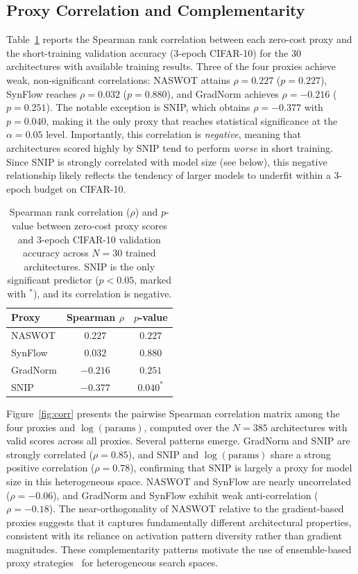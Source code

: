 \documentclass[10pt,twocolumn,letterpaper]{article}
\newcommand{\naswot}{NASWOT\xspace}
\begin{document}
\subsection{Proxy Correlation and Complementarity}
\label{sec:correlation}

Table~\ref{tab:proxy_acc} reports the Spearman rank correlation between each zero-cost proxy and the short-training validation accuracy (3-epoch CIFAR-10) for the 30 architectures with available training results. Three of the four proxies achieve weak, non-significant correlations: \naswot attains $\rho = 0.227$ ($p = 0.227$), SynFlow reaches $\rho = 0.032$ ($p = 0.880$), and GradNorm achieves $\rho = -0.216$ ($p = 0.251$). The notable exception is SNIP, which obtains $\rho = -0.377$ with $p = 0.040$, making it the only proxy that reaches statistical significance at the $\alpha = 0.05$ level. Importantly, this correlation is \emph{negative}, meaning that architectures scored highly by SNIP tend to perform \emph{worse} in short training. Since SNIP is strongly correlated with model size (see below), this negative relationship likely reflects the tendency of larger models to underfit within a 3-epoch budget on CIFAR-10.

\begin{table}[t]
\centering
\caption{Spearman rank correlation ($\rho$) and $p$-value between zero-cost proxy scores and 3-epoch CIFAR-10 validation accuracy across $N = 30$ trained architectures. SNIP is the only significant predictor ($p < 0.05$, marked with $^*$), and its correlation is negative.}
\label{tab:proxy_acc}
\begin{tabular}{lcc}
\toprule
Proxy & Spearman $\rho$ & $p$-value \\
\midrule
NASWOT & $0.227$ & $0.227$ \\
SynFlow & $0.032$ & $0.880$ \\
GradNorm & $-0.216$ & $0.251$ \\
SNIP & $-0.377$ & $0.040^*$ \\
\bottomrule
\end{tabular}
\end{table}

Figure~\ref{fig:corr} presents the pairwise Spearman correlation matrix among the four proxies and $\log(\text{params})$, computed over the $N = 385$ architectures with valid scores across all proxies. Several patterns emerge. GradNorm and SNIP are strongly correlated ($\rho = 0.85$), and SNIP and $\log(\text{params})$ share a strong positive correlation ($\rho = 0.78$), confirming that SNIP is largely a proxy for model size in this heterogeneous space. \naswot and SynFlow are nearly uncorrelated ($\rho = -0.06$), and GradNorm and SynFlow exhibit weak anti-correlation ($\rho = -0.18$). The near-orthogonality of \naswot relative to the gradient-based proxies suggests that it captures fundamentally different architectural properties, consistent with its reliance on activation pattern diversity rather than gradient magnitudes. These complementarity patterns motivate the use of ensemble-based proxy strategies~\cite{lee2024aznas} for heterogeneous search spaces.
\end{document}
